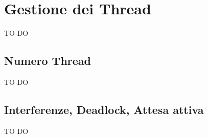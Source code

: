 % 
%
%

\section{Gestione dei Thread} %
\label{sec:gestione_dei_thread}
TO DO
	\subsection{Numero Thread} %
	\label{sub:numero_thread}
	TO DO
	
	\subsection{Interferenze, Deadlock, Attesa attiva} %
	\label{sub:interferenze_deadlock_attesa_attiva}
	TO DO
	




